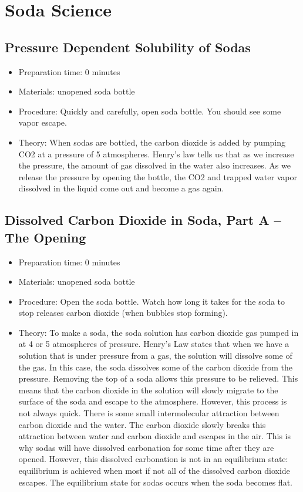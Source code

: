 \section{Soda Science}

\subsection{Pressure Dependent Solubility of Sodas}
\begin{itemize}
\item{Preparation time: 0 minutes}
\item{Materials: unopened soda bottle}
\item{Procedure: Quickly and carefully, open soda bottle. You should see some vapor escape.}
\item{Theory: When sodas are bottled, the carbon dioxide is added by pumping CO2 at a pressure of 5 atmospheres. Henry’s law tells us that as we increase the pressure, the amount of gas dissolved in the water also increases. As we release the pressure by opening the bottle, the CO2 and trapped water vapor dissolved in the liquid come out and become a gas again.}
\end{itemize}

\subsection{Dissolved Carbon Dioxide in Soda, Part A – The Opening}
\begin{itemize}
\item{Preparation time: 0 minutes}
\item{Materials: unopened soda bottle}
\item{Procedure: Open the soda bottle. Watch how long it takes for the soda to stop releases carbon dioxide (when bubbles stop forming).}
\item{Theory: To make a soda, the soda solution has carbon dioxide gas pumped in at 4 or 5 atmospheres of pressure. Henry’s Law states that when we have a solution that is under pressure from a gas, the solution will dissolve some of the gas. In this case, the soda dissolves some of the carbon dioxide from the pressure. Removing the top of a soda allows this pressure to be relieved. This means that the carbon dioxide in the solution will slowly migrate to the surface of the soda and escape to the atmosphere. However, this process is not always quick. There is some small intermolecular attraction between carbon dioxide and the water. The carbon dioxide slowly breaks this attraction between water and carbon dioxide and escapes in the air. This is why sodas will have dissolved carbonation for some time after they are opened. However, this dissolved carbonation is not in an equilibrium state: equilibrium is achieved when most if not all of the dissolved carbon dioxide escapes. The equilibrium state for sodas occurs when the soda becomes flat.}
\end{itemize}

